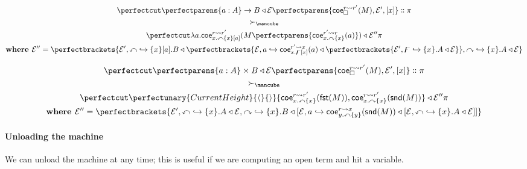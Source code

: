\documentclass{article}
\newcommand\Clo[2]{#1\triangleleft{#2}}
\newcommand\Coe[4]{\mathsf{coe}^{#1\leadsto{#2}}_{#3} (#4)}
\newcommand\DFun[3]{\perfectparens{#1:#2}\to{#3}}
\newcommand\DPair[3]{\perfectparens{#1:#2}\times{#3}}
\newcommand\Lam[2]{\lambda{#1}.{#2}}
\newcommand\Fst[1]{\mathsf{fst} (#1)}
\newcommand\Snd[1]{\mathsf{snd} (#1)}
\newcommand\Cons[2]{{#1}\dblcolon{#2}}
\newcommand\Frame[3]{\perfectparens{#1,#2,#3}}
\newcommand\Cfg[3]{\cut{\Clo{#1}{#2}}{#3}}
\newcommand\App[2]{{#1}\perfectparens{#2}}
\newcommand\Pair[2]{\perfectunary{CurrentHeight}{\langle}{\rangle}{#1,#2}}
\newcommand\Stable{\text{\mancube}}
\newcommand\Meta[1]{\mathbb{#1}}
\begin{document}
\begin{gather*}
  \Cfg{\DFun{a}{A}{B}}{\mathcal{E}}{\Cons{\Frame{\Coe{r}{r'}{\Box}{M}}{\mathcal{E}'}{[x]}}{\pi}}
  \\
  \succ_{\Stable}
  \\
  \Cfg{
    \Lam{a}{
      \Coe{r}{r'}{x.\Meta{x}\{x\}[a]}{
        \App{M}{
          \Coe{r'}{r}{x.\Meta{y}\{x\}}{a}
        }
      }
    }
  }{
    \mathcal{E}''
  }{
    \pi
  }
  \\
  \textbf{where }
  \mathcal{E}'' =
    \perfectbrackets{
      \mathcal{E}',
      \Meta{x}\hookrightarrow
      \{x\}[a].\Clo{B}{
        \perfectbrackets{
          \mathcal{E},a\hookrightarrow
          \Clo{
            \Coe{r'}{x}{x.\Meta{z}[x]}{a}
          }{
            \perfectbrackets{
              \mathcal{E'},
              \Meta{z}\hookrightarrow
              \{x\}.\Clo{A}{\mathcal{E}}
            }
          }
        }
      },
      \Meta{y}\hookrightarrow
      \{x\}.
      \Clo{A}{\mathcal{E}}
    }
\end{gather*}


\begin{gather*}
  \Cfg{
    \DPair{a}{A}{B}
  }{
    \mathcal{E}
  }{
    \Cons{\Frame{\Coe{r}{r'}{\Box}{M}}{\mathcal{E}'}{[x]}}{\pi}
  }
  \\
  \succ_{\Stable}
  \\
  \Cfg{
    \Pair{
      \Coe{r}{r'}{x.\Meta{x}\{x\}}{\Fst{M}}
    }{
      \Coe{r}{r'}{x.\Meta{y}\{x\}}{\Snd{M}}
    }
  }{
    \mathcal{E}''
  }{
    \pi
  }
  \\
  \textbf{where }
  \mathcal{E}'' =
    \perfectbrackets{
      \mathcal{E}',
      \Meta{x}\hookrightarrow{\{x\}.\Clo{A}{\mathcal{E}}},
      \Meta{y}\hookrightarrow{\{x\}.\Clo{B}{[\mathcal{E},a\hookrightarrow\Clo{\Coe{r}{x}{y.\Meta{x}\{y\}}{\Snd{M}}}{[\mathcal{E},\Meta{x}\hookrightarrow{\{x\}.\Clo{A}{\mathcal{E}}}]}]}}
    }
\end{gather*}

\paragraph{Unloading the machine}

We can unload the machine at any time; this is useful if we are
computing an open term and hit a variable.

\end{document}
